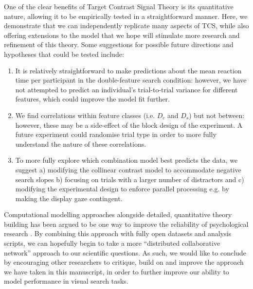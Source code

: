 \documentclass[preprint,12pt,authoryear]{elsarticle}
\begin{document}
One of the clear benefits of Target Contrast Signal Theory \citep{lleras2020target} is its quantitative nature, allowing it to be empirically tested in a straightforward manner. Here, we demonstrate that we can independently replicate many aspects of TCS, while also offering extensions to the model that we hope will stimulate more research and refinement of this theory. Some suggestions for possible future directions and hypotheses that could be tested include:

\begin{enumerate}
\item It is relatively straightforward to make predictions about the mean reaction time per participant in the double-feature search condition: however, we have not  attempted to predict an individual's trial-to-trial variance for different features, which could improve the model fit further.
\\
\item We find correlations within feature classes (i.e. $D_c$ and $D_s$) but not between: however, these may be a side-effect of the block design of the experiment. A future experiment could randomise trial type in order to more fully understand the nature of these correlations.
\\
\item To more fully explore which combination model best predicts the data, we suggest a) modifying the collinear contrast model to accommodate negative search slopes b) focusing on trials with a larger number of distractors and c) modifying the experimental design to enforce parallel processing e.g. by making the display gaze contingent.
\end{enumerate}

Computational modelling approaches alongside detailed, quantitative theory building has been argued to be one way to improve the reliability of psychological research \citep{oberauer2019addressing, guest2021computational}. By combining this approach with fully open datasets and analysis scripts, we can hopefully begin to take a more ``distributed collaborative network'' approach \citep{moshontz2018psychological} to our scientific questions. As such, we would like to conclude by encouraging other researchers to critique, build on and improve the approach we have taken in this manuscript, in order to further improve our ability to model performance in visual search tasks. 

%
\end{document}
